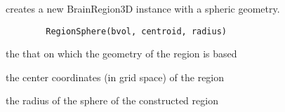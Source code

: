 \begin{Description}\relax
creates a new BrainRegion3D instance with a spheric geometry.
\end{Description}
\begin{Usage}
\begin{verbatim}
        RegionSphere(bvol, centroid, radius)    
\end{verbatim}
\end{Usage}
\begin{Arguments}
\begin{ldescription}
\item[\code{bvol}] the  that on which the geometry of the region is based 
\item[\code{centroid}] the center coordinates (in grid space) of the region 
\item[\code{radius}] the radius of the sphere of the constructed region 
\end{ldescription}
\end{Arguments}

